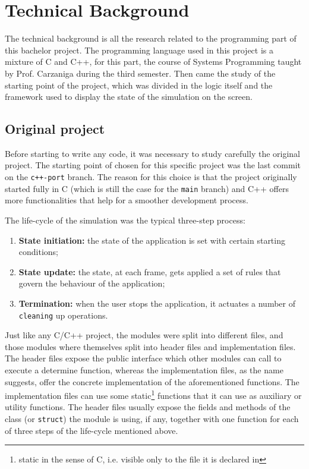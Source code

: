 \section{Technical Background}

The technical background is all the research related to the programming part of
this bachelor project. The programming language used in this project is a
mixture of C and C++, for this part, the course of Systems Programming taught by
Prof. Carzaniga during the third semester. Then came the study of the starting
point of the project, which was divided in the logic itself and the framework
used to display the state of the simulation on the screen.

\subsection{Original project}

Before starting to write any code, it was necessary to study carefully the
original project. The starting point of chosen for this specific project was the
last commit on the \texttt{c++-port} branch. The reason for this choice is that
the project originally started fully in C (which is still the case for the
\texttt{main} branch) and C++ offers more functionalities that help for a
smoother development process.

The life-cycle of the simulation was the typical three-step process:
\begin{enumerate}
	\item \textbf{State initiation:} the state of the application is set with certain
	      starting conditions;
	\item \textbf{State update:} the state, at each frame, gets applied a set of rules that
	      govern the behaviour of the application;
	\item \textbf{Termination:} when the user stops the application, it actuates a number
	      of \texttt{cleaning} up operations.
\end{enumerate}

Just like any C/C++ project, the modules were split into different files, and
those modules where themselves split into header files and implementation files.
The header files expose the public interface which other modules can call to
execute a determine function, whereas the implementation files, as the name
suggests, offer the concrete implementation of the aforementioned functions. The
implementation files can use some static\footnote{static in the sense of C,
	i.e. visible only to the file it is declared in} functions that it can use
as auxiliary or utility functions. The header files usually expose the fields
and methods of the class (or \texttt{struct}) the module is using, if any, together
with one function for each of three steps of the life-cycle mentioned above.

